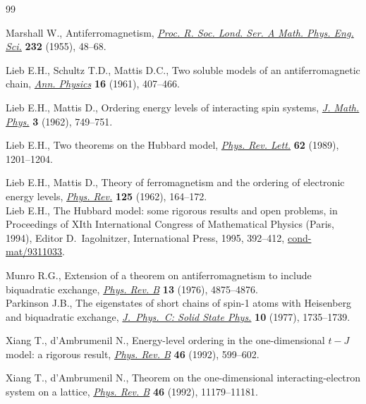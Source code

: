 \documentclass[pdftex]{sigma}
\begin{document}
\begin{thebibliography}{99}

\footnotesize\itemsep=0pt

Marshall W.,
Antiferromagnetism,
\href{http://dx.doi.org/10.1098/rspa.1955.0200}{{\it Proc. R. Soc. Lond. Ser. A Math. Phys. Eng. Sci.}} {\bf 232}  (1955), 48--68.

Lieb E.H., Schultz T.D., Mattis D.C.,
Two soluble models of an antiferromagnetic chain,
\href{http://dx.doi.org/10.1016/0003-4916(61)90115-4}{{\it Ann. Physics}} {\bf 16} (1961), 407--466.

Lieb E.H., Mattis D.,
Ordering energy levels of interacting spin systems,
\href{http://dx.doi.org/10.1063/1.1724276}{{\it J. Math. Phys.}} {\bf 3} (1962), 749--751.

Lieb E.H.,
Two theorems on the Hubbard model,
\href{http://dx.doi.org/10.1103/PhysRevLett.62.1201}{{\it Phys. Rev. Lett.}} {\bf 62} (1989), 1201--1204.

Lieb E.H., Mattis D.,
Theory of ferromagnetism and the ordering of electronic energy levels,
\href{http://dx.doi.org/10.1103/PhysRev.125.164}{{\it Phys. Rev.}} {\bf 125} (1962), 164--172.
\\
Lieb E.H.,
The Hubbard model: some rigorous results and open problems,
in Proceedings of  XIth International Congress of Mathematical Physics (Paris, 1994), Editor D.~Iagolnitzer, International Press, 1995, 392--412,
\href{http://arxiv.org/abs/cond-mat/9311033}{cond-mat/9311033}.


Munro R.G.,
Extension of a theorem on antiferromagnetism to include biquadratic exchange,
\href{http://dx.doi.org/10.1103/PhysRevB.13.4875}{{\it Phys. Rev. B}} {\bf 13} (1976), 4875--4876.
\\
Parkinson J.B.,
The eigenstates of short chains of spin-1 atoms with Heisenberg and biquadratic exchange,
\href{http://dx.doi.org/10.1088/0022-3719/10/10/015}{{\it J.~Phys.~C: Solid State Phys.}} {\bf 10} (1977), 1735--1739.


Xiang T., d'Ambrumenil N.,
Energy-level ordering in the one-dimensional $t-J$ model: a rigorous result,
\href{http://dx.doi.org/10.1103/PhysRevB.46.599}{{\it Phys. Rev. B}} {\bf 46} (1992), 599--602.

Xiang T., d'Ambrumenil N.,
Theorem on the one-dimensional interacting-electron system on a lattice,
\href{http://dx.doi.org/10.1103/PhysRevB.46.11179}{{\it Phys. Rev. B}} {\bf 46}  (1992), 11179--11181.


\end{thebibliography}
\end{document}
